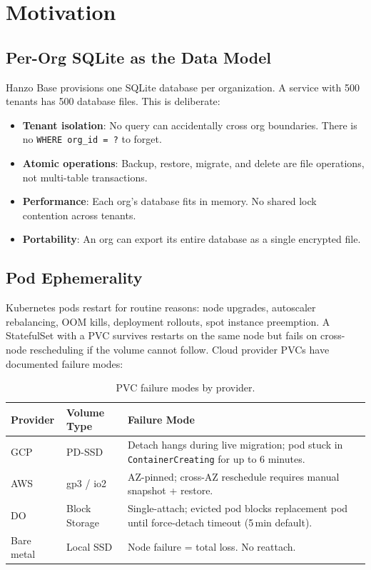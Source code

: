 \section{Motivation}
\label{sec:motivation}

\subsection{Per-Org SQLite as the Data Model}

Hanzo Base provisions one SQLite database per organization. A service
with 500 tenants has 500 database files. This is deliberate:

\begin{itemize}[nosep]
  \item \textbf{Tenant isolation}: No query can accidentally cross org
    boundaries. There is no \texttt{WHERE org\_id = ?} to forget.
  \item \textbf{Atomic operations}: Backup, restore, migrate, and
    delete are file operations, not multi-table transactions.
  \item \textbf{Performance}: Each org's database fits in memory. No
    shared lock contention across tenants.
  \item \textbf{Portability}: An org can export its entire database as
    a single encrypted file.
\end{itemize}

\subsection{Pod Ephemerality}

Kubernetes pods restart for routine reasons: node upgrades, autoscaler
rebalancing, OOM kills, deployment rollouts, spot instance preemption.
A StatefulSet with a PVC survives restarts on the same node but fails
on cross-node rescheduling if the volume cannot follow. Cloud provider
PVCs have documented failure modes:

\begin{table}[H]
\centering
\caption{PVC failure modes by provider.}
\label{tab:pvc-failures}
\begin{tabular}{@{}llp{6.5cm}@{}}
\toprule
\textbf{Provider} & \textbf{Volume Type} & \textbf{Failure Mode} \\
\midrule
GCP & PD-SSD & Detach hangs during live migration; pod stuck in
  \texttt{ContainerCreating} for up to 6 minutes. \\
AWS & gp3 / io2 & AZ-pinned; cross-AZ reschedule requires manual
  snapshot + restore. \\
DO & Block Storage & Single-attach; evicted pod blocks replacement pod
  until force-detach timeout (5\,min default). \\
Bare metal & Local SSD & Node failure = total loss. No reattach. \\
\bottomrule
\end{tabular}
\end{table}

